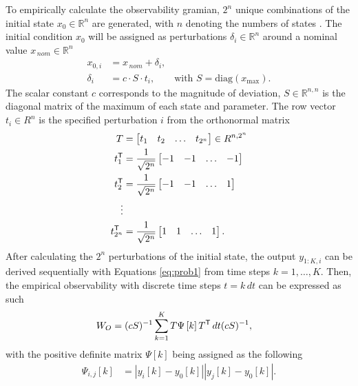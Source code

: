 \documentclass[nomenclature, english, bibtex]{kththesis}
\begin{document}
To empirically calculate the observability gramian, $2^n$ unique combinations of the initial state $x_0 \in \mathbb{R}^n$ are generated, with $n$ denoting the numbers of states \cite{eberle_identifiability_2012} \cite{hahn_improved_2002} \cite{geffen_observability_2008}.
The initial condition $x_0$ will be assigned as perturbations $\delta_i \in \mathbb{R}^n$ around a nominal value $x_{\,nom} \in \mathbb{R}^n$
\begin{equation}
    \begin{aligned}
        x_{0,i} &= x_{\,nom} + \delta_i,  \\
        \delta_i &= c \cdot S \cdot t_i, \qquad \text{with } S=\mathrm{diag}(x_{\text{max}}).
    \end{aligned}
\end{equation}
The scalar constant $c$ corresponds to the magnitude of deviation, $S \in \mathbb{R}^{n,n}$ is the diagonal matrix of the maximum of each state and parameter. The row vector $t_i \in R^n$ is the specified perturbation $i$ from the orthonormal matrix
\begin{equation}
    \begin{aligned}
        T &= \begin{bmatrix} t_1 & t_2 & \dots & t_{2^n} \end{bmatrix} \in R^{n,2^n} \\
        t_1^{\sf T} &= \frac{1}{\sqrt{2^n}} \begin{bmatrix}
            -1 & -1 & \dots & -1
        \end{bmatrix} \\
        t_2^{\sf T} &= \frac{1}{\sqrt{2^n}} \begin{bmatrix}
            -1 & -1 & \dots & 1
        \end{bmatrix} \\
        \vdots \\
        t_{2^n}^{\sf T} &= \frac{1}{\sqrt{2^n}} \begin{bmatrix} 1 & 1 & \dots & 1 \end{bmatrix}. \\
    \end{aligned}
\end{equation}
After calculating the $2^n$ perturbations of the initial state, the output $y_{1:K,i}$ can be derived sequentially with Equations \eqref{eq:prob1} from time steps $k=1,\dots,K$.
Then, the empirical observability with discrete time steps $t=k \,dt$ can be expressed as such
\begin{align}
    W_O &= (cS)^{-1} \sum_{k=1}^K T \Psi \left[k\right] T^{\sf T} \,dt (cS)^{-1},
\end{align} 
with the positive definite matrix $\Psi \left[k\right]$ being assigned as the following
\begin{align}
    \Psi_{i,j}\left[k\right] &= \left|y_i \left[k\right] - y_0 \left[k\right] \right| \left|y_j \left[k\right] - y_0 \left[k\right] \right|.
\end{align}
\end{document}
